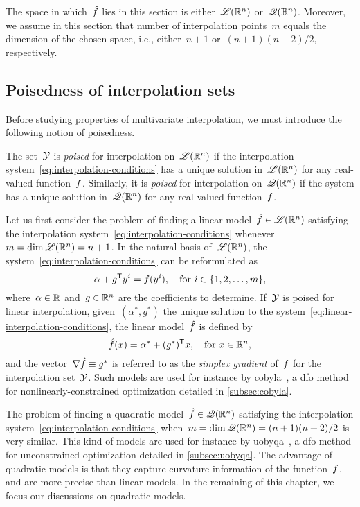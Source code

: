 The space in which~$\objm$ lies in this section is either~$\mathscr{L}(\mathbb{R}^n)$ or~$\mathscr{Q}(\mathbb{R}^n)$.
Moreover, we assume in this section that number of interpolation points~$m$ equals the dimension of the chosen space, i.e., either~$n + 1$ or~$(n + 1)(n + 2) / 2$, respectively.

\subsection{Poisedness of interpolation sets}

Before studying properties of multivariate interpolation, we must introduce the following notion of poisedness.

\begin{definition}[Poisedness]
    The set~$\xpt$ is \emph{poised} for interpolation on~$\mathscr{L}(\mathbb{R}^n)$ if the interpolation system~\cref{eq:interpolation-conditions} has a unique solution in~$\mathscr{L}(\mathbb{R}^n)$ for any real-valued function~$f$.
    Similarly, it is \emph{poised} for interpolation on~$\mathscr{Q}(\mathbb{R}^n)$ if the system has a unique solution in~$\mathscr{Q}(\mathbb{R}^n)$ for any real-valued function~$f$.
\end{definition}

Let us first consider the problem of finding a linear model~$\objm \in \lpoly$ satisfying the interpolation system~\cref{eq:interpolation-conditions} whenever~$m = \dim \mathscr{L}(\mathbb{R}^n) = n + 1$.
In the natural basis of~$\mathscr{L}(\mathbb{R}^n)$, the system~\cref{eq:interpolation-conditions} can be reformulated as
\begin{equation}
    \label{eq:linear-interpolation-conditions}
    \alpha + g^{\mathsf{T}} y^i = f(y^i), \quad \text{for~$i \in \{1, 2, \dots, m\}$},
\end{equation}
where~$\alpha \in \mathbb{R}$ and~$g \in \mathbb{R}^n$ are the coefficients to determine.
If~$\xpt$ is poised for linear interpolation, given~$(\alpha^{\ast}, g^{\ast})$ the unique solution to the system~\cref{eq:linear-interpolation-conditions}, the linear model~$\objm$ is defined by
\begin{equation*}
    \objm(x) = \alpha^{\ast} + (g^{\ast})^{\T} x, \quad \text{for~$x \in \R^n$},
\end{equation*}
and the vector~$\nabla \objm \equiv g^{\ast}$ is referred to as the \emph{simplex gradient} of~$f$ for the interpolation set~$\xpt$.
Such models are used for instance by \gls{cobyla}~\cite{Powell_1994}, a \gls{dfo} method for nonlinearly-constrained optimization detailed in \cref{subsec:cobyla}.

The problem of finding a quadratic model~$\objm \in \qpoly$ satisfying the interpolation system~\cref{eq:interpolation-conditions} when~$m = \dim \mathscr{Q}(\mathbb{R}^n) = (n + 1)(n + 2) / 2$ is very similar.
This kind of models are used for instance by \gls{uobyqa}~\cite{Powell_2002}, a \gls{dfo} method for unconstrained optimization detailed in \cref{subsec:uobyqa}.
The advantage of quadratic models is that they capture curvature information of the function~$f$, and are more precise than linear models.
In the remaining of this chapter, we focus our discussions on quadratic models.

